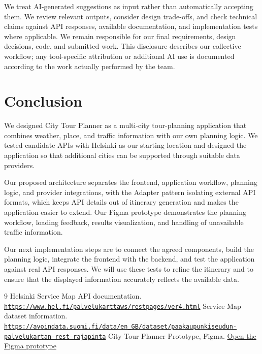 \documentclass[a4paper,10pt]{article}
\begin{document}
We treat AI-generated suggestions as input rather than automatically accepting them. We review relevant outputs, consider design trade-offs, and check technical claims against API responses, available documentation, and implementation tests where applicable. We remain responsible for our final requirements, design decisions, code, and submitted work. This disclosure describes our collective workflow; any tool-specific attribution or additional AI use is documented according to the work actually performed by the team.

\section{Conclusion}
We designed City Tour Planner as a multi-city tour-planning application that combines weather, place, and traffic information with our own planning logic. We tested candidate APIs with Helsinki as our starting location and designed the application so that additional cities can be supported through suitable data providers.

Our proposed architecture separates the frontend, application workflow, planning logic, and provider integrations, with the Adapter pattern isolating external API formats, which keeps API details out of itinerary generation and makes the application easier to extend. Our Figma prototype demonstrates the planning workflow, loading feedback, results visualization, and handling of unavailable traffic information.

Our next implementation steps are to connect the agreed components, build the planning logic, integrate the frontend with the backend, and test the application against real API responses. We will use these tests to refine the itinerary and to ensure that the displayed information accurately reflects the available data.

\renewcommand{\refname}{References}
\begin{thebibliography}{9}
\setlength{\itemsep}{2pt}
\small
{} Helsinki Service Map API documentation. \href{https://www.hel.fi/palvelukarttaws/restpages/ver4.html}{\nolinkurl{https://www.hel.fi/palvelukarttaws/restpages/ver4.html}}
 Service Map dataset information. \href{https://avoindata.suomi.fi/data/en_GB/dataset/paakaupunkiseudun-palvelukartan-rest-rajapinta}{\nolinkurl{https://avoindata.suomi.fi/data/en_GB/dataset/paakaupunkiseudun-palvelukartan-rest-rajapinta}}
 City Tour Planner Prototype, Figma. \href{https://www.figma.com/proto/xLJSzzdVMFzEHprbCb2SrW/City-Tour-Planner-Prototype?node-id=0-1&t=c8UDhzHjZfPHAGFD-1}{Open the Figma prototype}
\end{thebibliography}
\end{document}
